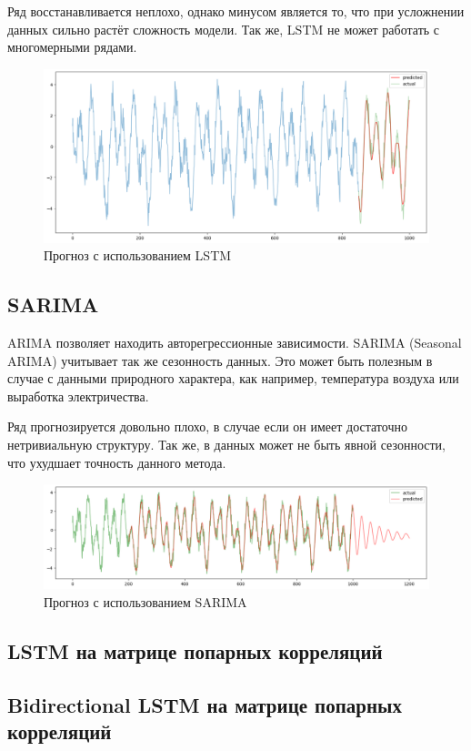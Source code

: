 \documentclass{article}
\begin{document}
Ряд восстанавливается неплохо, однако минусом является то, что при усложнении данных сильно растёт сложность модели. Так же, LSTM не может работать с многомерными рядами.

\begin{figure}[H]
	\centering
	\includegraphics[width=\textwidth]{LSTM-prediction.png}
	\caption{Прогноз с использованием LSTM}
	\label{fig:fig1}
\end{figure}

\subsection{SARIMA}

ARIMA позволяет находить авторегрессионные зависимости. SARIMA (Seasonal ARIMA) учитывает так же сезонность данных. Это может быть полезным в случае с данными природного характера, как например, температура воздуха или выработка электричества.

Ряд прогнозируется довольно плохо, в случае если он имеет достаточно нетривиальную структуру. Так же, в данных может не быть явной сезонности, что ухудшает точность данного метода.

\begin{figure}[H]
	\centering
	\includegraphics[width=\textwidth]{SARIMA-prediction.png}
	\caption{Прогноз с использованием SARIMA}
	\label{fig:fig2}
\end{figure}

\subsection{LSTM на матрице попарных корреляций}

\subsection{Bidirectional LSTM на матрице попарных корреляций}





\end{document}
